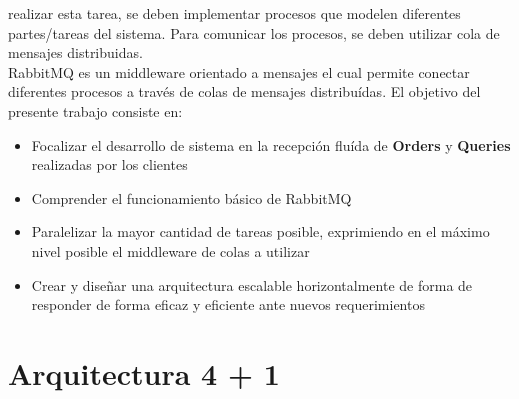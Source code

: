         realizar esta tarea, se deben implementar procesos que
        modelen diferentes partes/tareas del sistema. Para comunicar los 
        procesos, se deben utilizar cola de mensajes distribuidas. \\
        \indent RabbitMQ es un middleware orientado a mensajes el cual 
        permite conectar diferentes procesos a través de colas de mensajes
        distribuídas. El objetivo del presente trabajo consiste en:
        
        \begin{itemize}
            \item Focalizar el desarrollo de sistema en la recepción fluída
            de \textbf{Orders} y \textbf{Queries} realizadas por los clientes
            \item Comprender el funcionamiento básico de RabbitMQ 
            \item Paralelizar la mayor cantidad de tareas posible, exprimiendo
            en el máximo nivel posible el middleware de colas a utilizar
            \item Crear y diseñar una arquitectura escalable horizontalmente
            de forma de responder de forma eficaz y eficiente ante nuevos
            requerimientos
        \end{itemize}

    \newpage
    \section{Arquitectura 4 + 1}
